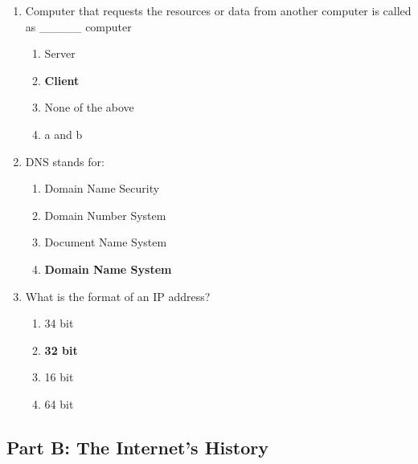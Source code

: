 \documentclass{article}
\begin{document}
\begin{enumerate}[label=\arabic*.]
    \item Computer that requests the resources or data from another computer is called as \_\_\_\_\_ computer
    \begin{enumerate}
        \item Server
        \item \textbf{Client}
        \item None of the above
        \item a and b
    \end{enumerate}

    \item DNS stands for:
    \begin{enumerate}
        \item Domain Name Security
        \item Domain Number System
        \item Document Name System
        \item \textbf{Domain Name System}
    \end{enumerate}

    \item What is the format of an IP address?
    \begin{enumerate}
        \item 34 bit
        \item \textbf{32 bit}
        \item 16 bit
        \item 64 bit
    \end{enumerate}

\end{enumerate}

\subsection*{Part B: The Internet's History}
\end{document}
